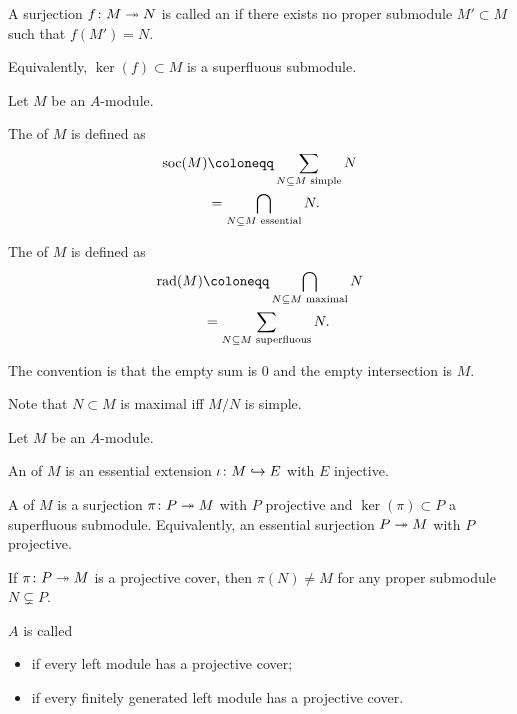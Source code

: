 \documentclass[12pt]{article}
\begin{document}
\begin{defn}
	A surjection $f \colon M \twoheadrightarrow N$ is called an  if 
	there exists no proper submodule $M' \subset M$ such that $f(M') = N$.

	Equivalently, $\ker(f) \subset M$ is a superfluous submodule.
\end{defn}

\begin{defn}
	Let $M$ be an $A$-module. 

	The  of $M$ is defined as
	\begin{align*} 
		\soc(M) &\coloneqq \sum_{N \subset M \text{ simple}} N\\
		&= \bigcap_{N \subset M \text{ essential}} N.
	\end{align*} 

	The  of $M$ is defined as
	\begin{align*} 
		\rad(M) &\coloneqq \bigcap_{N \subset M \text{ maximal}} N \\
		&= \sum_{N \subset M \text{ superfluous}} N.
	\end{align*}

	The convention is that the empty sum is $0$ and the empty intersection is $M$.
\end{defn}
Note that $N \subset M$ is maximal iff $M/N$ is simple.

\begin{defn}
	Let $M$ be an $A$-module. 

	An  of $M$ is an essential extension $\iota \colon M \hookrightarrow E$ with $E$ injective.

	A  of $M$ is a surjection $\pi \colon P \twoheadrightarrow M$ with $P$ projective and $\ker(\pi) \subset P$ a superfluous submodule. 
	Equivalently, an essential surjection $P \twoheadrightarrow M$ with $P$ projective.
\end{defn}
If $\pi \colon P \twoheadrightarrow M$ is a projective cover, then $\pi(N) \neq M$ for any proper submodule $N \subsetneq P$.

\begin{defn}
	$A$ is called
	\begin{itemize}
		\item {} if every left module has a projective cover;
		\item {} if every finitely generated left module has a projective cover.
	\end{itemize}
\end{defn}
\end{document}
